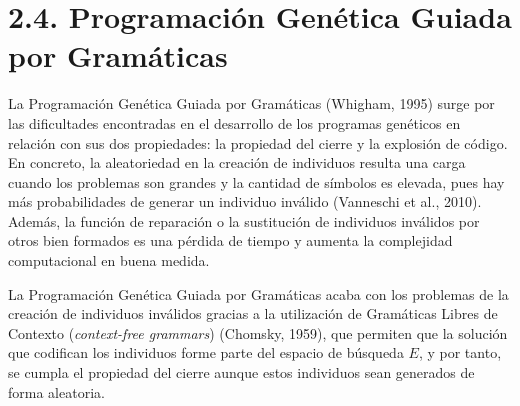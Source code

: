 \documentclass[spanish,a4paper,12pt,twoside]{report}
\begin{document}
  \section*{\Large 2.4. Programación Genética Guiada por Gramáticas}
  La Programación Genética Guiada por Gramáticas (Whigham, 1995) surge por las dificultades encontradas en el desarrollo de los programas genéticos en relación con sus dos propiedades: la propiedad del cierre y la explosión de código. En concreto, la aleatoriedad en la creación de individuos resulta una carga cuando los problemas son grandes y la cantidad de símbolos es elevada, pues hay más probabilidades de generar un individuo inválido (Vanneschi et al., 2010). Además, la función de reparación o la sustitución de individuos inválidos por otros bien formados es una pérdida de tiempo y aumenta la complejidad computacional en buena medida. \par
  La Programación Genética Guiada por Gramáticas acaba con los problemas de la creación de individuos inválidos gracias a la utilización de Gramáticas Libres de Contexto (\emph{context-free grammars}) (Chomsky, 1959), que permiten que la solución que codifican los individuos forme parte del espacio de búsqueda $E$, y por tanto, se cumpla el propiedad del cierre aunque estos individuos sean generados de forma aleatoria.
  
\end{document}

